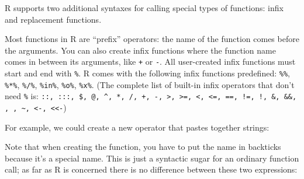 
R supports two additional syntaxes for calling special types of
functions: infix and replacement functions.


Most functions in R are ``prefix'' operators: the name of the function
comes before the arguments. You can also create infix functions where
the function name comes in between its arguments, like \texttt{+} or
\texttt{-}. All user-created infix functions must start and end with
\texttt{\%}. R comes with the following infix functions predefined:
\texttt{\%\%}, \texttt{\%*\%}, \texttt{\%/\%}, \texttt{\%in\%},
\texttt{\%o\%}, \texttt{\%x\%}. (The complete list of built-in infix
operators that don't need \texttt{\%} is:
\texttt{::, :::, \$, @, \^{}, *, /, +, -, \textgreater{}, \textgreater{}=, \textless{}, \textless{}=, ==, !=, !, \&, \&\&, \textbar{}, \textbar{}\textbar{}, \textasciitilde{}, \textless{}-, \textless{}\textless{}-})
  \indexc{\%\%}

For example, we could create a new operator that pastes together
strings:

\begin{Shaded}
\end{Shaded}

Note that when creating the function, you have to put the name in
backticks because it's a special name. This is just a syntactic sugar
for an ordinary function call; as far as R is concerned there is no
difference between these two expressions:

\begin{Shaded}
\end{Shaded}

